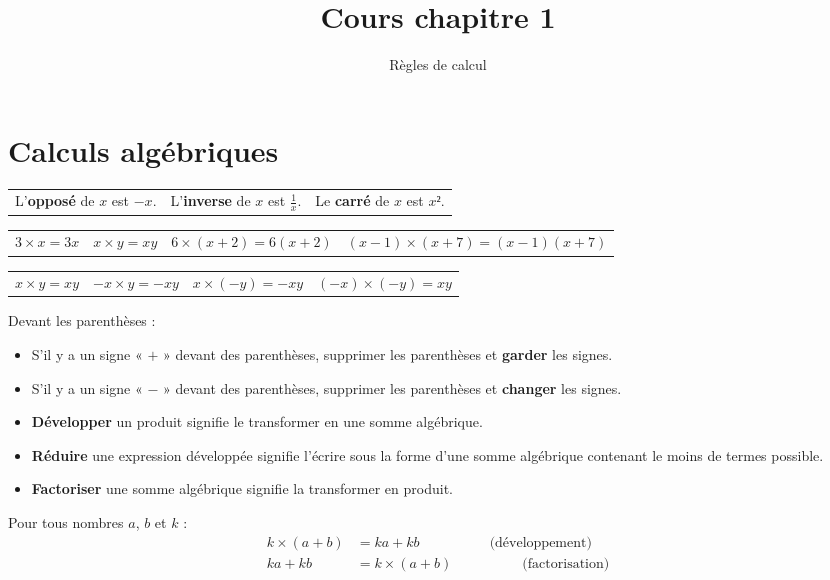 \documentclass[
	10pt,
	classe=$2^{de}$,
]{coursclass}
\title{Cours chapitre 1}
\author{Règles de calcul}
\date{}
\begin{document}
\maketitle

\setcounter{section}{1}
\section{Calculs algébriques}

\begin{vocabulaire}
	\begin{tabularx}{\linewidth}{XXX}
		L'\textbf{opposé} de $x$ est $-x$. & L'\textbf{inverse} de $x$ est $\frac{1}{x}$. & Le \textbf{carré} de $x$ est $x²$.
	\end{tabularx}
\end{vocabulaire}

\begin{greybox}[frametitle={Notation}]
	\newcommand{\localSpacing}{1.8em}
	\begin{tabular}{llll}
		$3 × x = 3x$ \hspace{\localSpacing} & $x × y = xy$ \hspace{\localSpacing} & $6 × (x + 2) = 6(x + 2)$ \hspace{\localSpacing} & $(x - 1) × (x + 7) = (x - 1)(x + 7)$
	\end{tabular}
\end{greybox}

\begin{greybox}[frametitle={Règle des signes}]
	\begin{tabularx}{\linewidth}{XXXX}
		$x × y = xy$ & $- x × y = -xy$ & $x × (-y) = -xy$ & $(-x) × (-y) = xy$
	\end{tabularx}
	\vspace{1em}

	Devant les parenthèses :
	\begin{itemize}
		\item S’il y a un signe « $+$ » devant des parenthèses, supprimer les parenthèses et \textbf{garder} les signes.
		\item S’il y a un signe « $-$ » devant des parenthèses, supprimer les parenthèses et \textbf{changer} les signes.
	\end{itemize}
\end{greybox}

\begin{definition}[]
	\begin{itemize}
		\item \textbf{Développer} un produit signifie le transformer en une somme algébrique.
		\item \textbf{Réduire} une expression développée signifie l’écrire sous la forme d’une somme algébrique contenant le moins de termes possible.
		\item \textbf{Factoriser} une somme algébrique signifie la transformer en produit.
	\end{itemize}
\end{definition}

\begin{propriete}
	Pour tous nombres $a$, $b$ et $k$ :
	\begin{align*}
		k × (a + b) & = ka + kb \hspace{5em}\text{(développement)}     \\
		ka + kb     & = k × (a + b) \hspace{5em}\text{(factorisation)}
	\end{align*}
\end{propriete}
\end{document}
